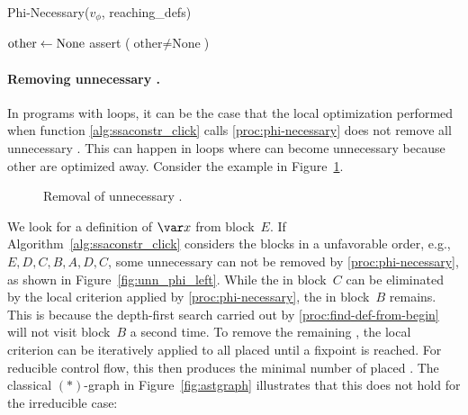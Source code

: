 {\begin{procedure}
  \caption{Phi-Necessary($v_\phi$, reaching\_defs)}
  \label{proc:phi-necessary}
  $\textrm{other} \gets \textnormal{None}$\;
  assert ($\textrm{other} \ne \textrm{None}$)\;
\end{procedure}

\paragraph{Removing unnecessary \phifuns.}

In programs with loops, it can be the case that the local optimization performed when function \ref{alg:ssaconstr_click} calls \ref{proc:phi-necessary} does not remove all unnecessary \phifuns. 
This can happen in loops where \phifuns can become unnecessary because other \phifuns are optimized away. 
Consider the example in Figure~\ref{fig:phiopt}.
\begin{figure}[htbp]
	\begin{center}
		\qquad
	\end{center}
	\caption{Removal of unnecessary \phifuns.}
	\label{fig:phiopt}
\end{figure}
We look for a definition of $\var x$ from block~$E$.
If Algorithm~\ref{alg:ssaconstr_click} considers the blocks in a unfavorable order, e.g., $E,D,C,B,A,D,C$, some unnecessary \phifuns can not be removed by \ref{proc:phi-necessary}, as shown in Figure~\ref{fig:unn_phi_left}.
While the \phifun in block~$C$ can be eliminated by the local criterion applied by \ref{proc:phi-necessary}, the \phifun in block~$B$ remains. 
This is because the depth-first search carried out by \ref{proc:find-def-from-begin} will not visit block~$B$ a second time.
To remove the remaining \phifuns, the local criterion can be iteratively applied to all placed \phifuns until a fixpoint is reached. 
For reducible control flow, this then produces the minimal number of placed \phifuns. 
The classical $(\ast)$-graph in Figure~\ref{fig:astgraph} illustrates that this does not hold for the irreducible case:

}
